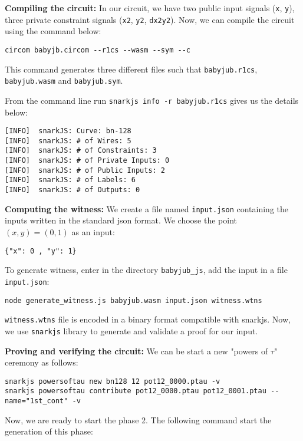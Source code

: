 \documentclass[a4paper,oneside,12pt]{book}
\begin{document}
\noindent \textbf{Compiling the circuit:} In our circuit, we have two public input signals (\verb|x|, \verb|y|), three private constraint signals (\verb|x2|, \verb|y2|, \verb|dx2y2|). Now, we can compile the circuit using the command below:

\begin{verbatim}
circom babyjb.circom --r1cs --wasm --sym --c
\end{verbatim}

\noindent This command generates three different files such that \verb|babyjub.r1cs|, \verb|babyjub.wasm| and \verb|babyjub.sym|.

\noindent From the command line run \verb|snarkjs info -r babyjub.r1cs| gives us the details below:

\begin{verbatim}
[INFO]  snarkJS: Curve: bn-128
[INFO]  snarkJS: # of Wires: 5
[INFO]  snarkJS: # of Constraints: 3
[INFO]  snarkJS: # of Private Inputs: 0
[INFO]  snarkJS: # of Public Inputs: 2
[INFO]  snarkJS: # of Labels: 6
[INFO]  snarkJS: # of Outputs: 0
\end{verbatim}

\noindent \textbf{Computing the witness:} We create a file named \verb|input.json| containing the inputs written in the standard json format. We choose the point $(x,y)=(0,1)$ as an input:

\begin{verbatim}
{"x": 0 , "y": 1}
\end{verbatim}

\noindent To generate witness, enter in the directory \verb|babyjub_js|, add the input in a file \verb|input.json|:

\begin{verbatim}
node generate_witness.js babyjub.wasm input.json witness.wtns
\end{verbatim}

\noindent \verb|witness.wtns| file is encoded in a binary format compatible with snarkjs. Now, we use \verb|snarkjs| library to generate and validate a proof for our input. 

\noindent \textbf{Proving and verifying the circuit:} We can be start a new "powers of $\tau$" ceremony as follows:
\begin{verbatim}
snarkjs powersoftau new bn128 12 pot12_0000.ptau -v
snarkjs powersoftau contribute pot12_0000.ptau pot12_0001.ptau --name="1st_cont" -v
\end{verbatim}

\noindent Now, we are ready to start the phase 2. The following command start the generation of this phase:
\end{document}
